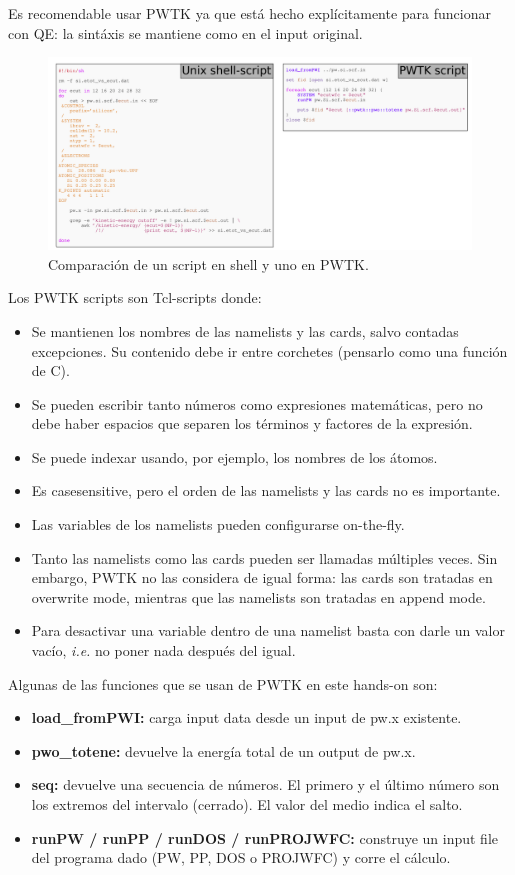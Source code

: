   Es recomendable usar PWTK ya que está hecho explícitamente para funcionar con QE: la sintáxis se mantiene como en el input original.

  \begin{figure}[H]
      \centering
      \includegraphics[scale = 0.4]{figs/D2/shellvspwtk.png}
      \caption{Comparación de un script en shell y uno en PWTK.}
  \end{figure}

  Los PWTK scripts son Tcl-scripts donde:
    \begin{itemize}
      \item Se mantienen los nombres de las namelists y las cards, salvo contadas excepciones. Su contenido debe ir entre corchetes (pensarlo como una función de C).
      \item Se pueden escribir tanto números como expresiones matemáticas, pero no debe haber espacios que separen los términos y factores de la expresión.
      \item Se puede indexar usando, por ejemplo, los nombres de los átomos.
      \item Es casesensitive, pero el orden de las namelists y las cards no es importante.
      \item Las variables de los namelists pueden configurarse on-the-fly.
      \item Tanto las namelists como las cards pueden ser llamadas múltiples veces. Sin embargo, PWTK no las considera de igual forma: las cards son tratadas en overwrite mode, mientras que las namelists son tratadas en append mode.
      \item Para desactivar una variable dentro de una namelist basta con darle un valor vacío, \emph{i.e.} no poner nada después del igual.
    \end{itemize}

    Algunas de las funciones que se usan de PWTK en este hands-on son:
      \begin{itemize}
        \item \textbf{load\_fromPWI:} carga input data desde un input de pw.x existente.
        \item \textbf{pwo\_totene:} devuelve la energía total de un output de pw.x.
        \item \textbf{seq:} devuelve una secuencia de números. El primero y el último número son los extremos del intervalo (cerrado). El valor del medio indica el salto.
        \item \textbf{runPW / runPP / runDOS / runPROJWFC:} construye un input file del programa dado (PW, PP, DOS o PROJWFC) y corre el cálculo.
      \end{itemize}

